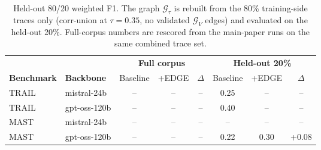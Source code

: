 \begin{table}[!tbp]
\centering
\footnotesize
\setlength{\tabcolsep}{4pt}
\begin{tabular}{l l cc c cc c}
\toprule
& & \multicolumn{3}{c}{\textbf{Full corpus}} & \multicolumn{3}{c}{\textbf{Held-out 20\%}} \\
\cmidrule(lr){3-5} \cmidrule(lr){6-8}
\textbf{Benchmark} & \textbf{Backbone} & Baseline & +EDGE & $\Delta$ & Baseline & +EDGE & $\Delta$ \\
\midrule
TRAIL & mistral-24b & -- & -- & -- & 0.25 & -- & -- \\
TRAIL & gpt-oss-120b & -- & -- & -- & 0.40 & -- & -- \\
MAST & mistral-24b & -- & -- & -- & -- & -- & -- \\
MAST & gpt-oss-120b & -- & -- & -- & 0.22 & 0.30 & +0.08 \\
\bottomrule
\end{tabular}
\caption{Held-out 80/20 weighted F1. The graph $\mathcal{G}_\tau$ is rebuilt from the 80\% training-side traces only (corr-union at $\tau{=}0.35$, no validated $\mathcal{G}_V$ edges) and evaluated on the held-out 20\%. Full-corpus numbers are rescored from the main-paper runs on the same combined trace set.}
\label{tab:rebuttal_holdout}
\end{table}
